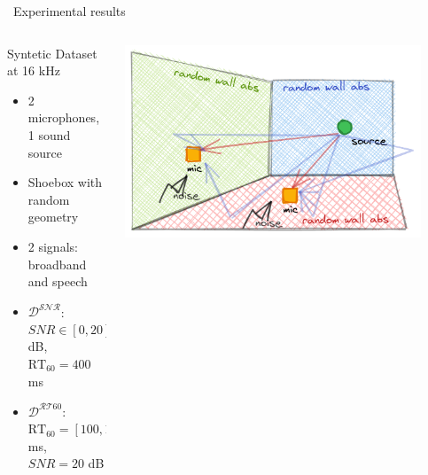 \begin{frame}[t]{\faFlask~Experimental results \hfill\faJediOrder}
    \cmark {}

    \begin{columns}[onlytextwidth]
        \begin{column}{0.50\textwidth}
            \begin{block}{Syntetic Dataset at 16 kHz}
                \small
                \begin{itemize}
                    \item 2 microphones, 1 sound source
                    \item Shoebox with random geometry
                    \item 2 signals: broadband and speech
                    \item $\mathcal{D^{\text{SNR}}}$: $SNR \in [0, 20]$ dB, $\text{RT}_{60} = 400$ ms
                    \item $\mathcal{D^{\text{RT60}}}$: $\text{RT}_{60} = [100, 1000]$ ms, $SNR = 20$ dB
                \end{itemize}
            \end{block}
        \end{column}

        \begin{column}{0.45\textwidth}
            \includegraphics[width=0.9\textwidth]{figures/aer_scenario4.png}
        \end{column}
    \end{columns}


\end{frame}
